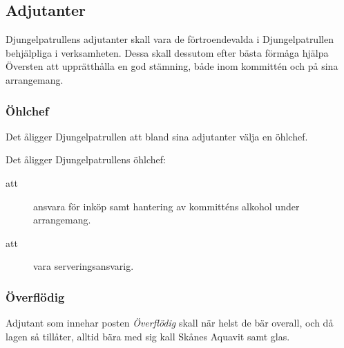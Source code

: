 \documentclass[a4paper]{article}
\begin{document}
\begin{foreningenv}{\forening{}}
    \subsection{Adjutanter}
    Djungelpatrullens adjutanter skall vara de förtroendevalda i Djungelpatrullen behjälpliga i verksamheten. Dessa skall dessutom efter bästa förmåga hjälpa Översten att upprätthålla en god stämning, både inom kommittén och på sina arrangemang.
        
    \subsubsection{Öhlchef}
    Det åligger Djungelpatrullen att bland sina adjutanter välja en öhlchef.
    
    Det åligger Djungelpatrullens öhlchef:
    \begin{description}
        \item[att] ansvara för inköp samt hantering av kommitténs alkohol under arrangemang.
        \item[att] vara serveringsansvarig.
    \end{description}
    
    \subsubsection{Överflödig}
    Adjutant som innehar posten \textit{Överflödig} skall när helst de bär overall, och då lagen så tillåter, alltid bära med sig kall Skånes Aquavit samt glas.
\end{foreningenv}
\end{document}
